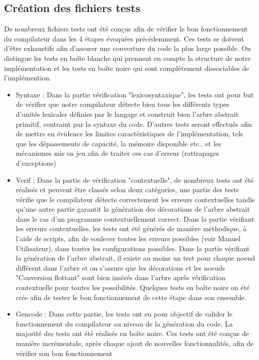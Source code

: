 \documentclass[11pt]{article}
\begin{document}
\subsection{Création des fichiers tests}
De nombreux fichiers tests ont été conçus afin de vérifier le bon fonctionnement du compilateur dans les 4 étapes évoquées précédemment. 
Ces tests se doivent d'être exhaustifs afin d'assurer une couverture du code la plus large possible. On distingue les tests en boîte blanche qui prennent en compte la structure de notre implémentation et les tests en boîte noire qui sont complètement dissociables de l'implémention.
\begin{itemize}
\item Syntaxe : Dans la partie vérification "lexicosyntaxique", les tests ont pour but de vérifier que notre compilateur détecte bien tous les différents types
d'unités lexicales définies par le langage et construit bien l'arbre abstrait primitif, contraint par la syntaxe du code. D'autres tests seront effectués afin de 
mettre en évidence les limites caractéristiques de l'implémentation, tels que les dépassements de capacité, la mémoire disponible etc.. et les mécanismes
mis en jeu afin de traiter ces cas d'erreur (rattrapages d'exceptions)  
\item Verif : Dans la partie de vérification "contextuelle", de nombreux tests ont été réalisés et peuvent être classés selon deux catégories,
une partie des tests vérifie que le compilateur détecte correctement les erreurs contextuelles tandis qu'une autre partie garantit
la génération des décorations de l'arbre abstrait dans le cas d'un programme contextuellement correct. Dans la partie vérifiant les erreurs contextuelles,
les tests ont été générés de manière méthodique, à l'aide de scripts, afin de soulever toutes les erreurs possibles (voir Manuel Utilisateur), 
dans toutes les configurations possibles. Dans la partie vérifiant la génération de l'arbre abstrait, il existe au moins un test pour chaque noeud différent
dans l'arbre et on s'assure que les décorations et les noeuds "Conversion flottant" sont bien insérés dans l'arbre après vérification contextuelle pour toutes 
les possibilités. Quelques tests en boîte noire on été crée afin de tester le bon fonctionnement de cette étape dans son ensemble.
\item Gencode : Dans cette partie, les tests ont eu pour objectif de valider le fonctionnement 
du compilateur au niveau de la génération du code. La majorité des tests ont été réalisés en boîte noire. 
Ces tests ont été conçus de manière incrémentale, après chaque ajout de nouvelles fonctionnalités, afin de vérifier son bon fonctionnement 

\end{itemize}
\end{document}
